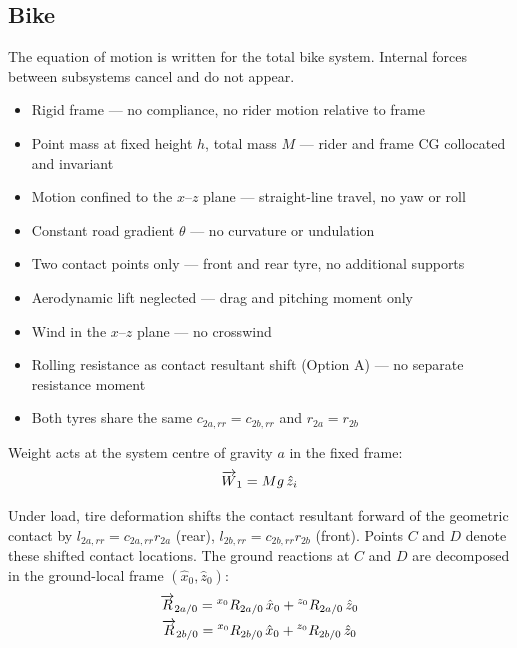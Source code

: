 \begin{aiblock}
\subsection{Bike}
The equation of motion is written for the total bike system. Internal forces between subsystems cancel and do not appear.

\begin{itemize}
    \item Rigid frame --- no compliance, no rider motion relative to frame
    \item Point mass at fixed height $h$, total mass $M$ --- rider and frame CG collocated and invariant
    \item Motion confined to the $x$--$z$ plane --- straight-line travel, no yaw or roll
    \item Constant road gradient $\theta$ --- no curvature or undulation
    \item Two contact points only --- front and rear tyre, no additional supports
    \item Aerodynamic lift neglected --- drag and pitching moment only
    \item Wind in the $x$--$z$ plane --- no crosswind
    \item Rolling resistance as contact resultant shift (Option A) --- no separate resistance moment
    \item Both tyres share the same $c_{2a,rr}=c_{2b,rr}$ and $r_{2a}=r_{2b}$
\end{itemize}

Weight acts at the system centre of gravity $a$ in the fixed frame:
\begin{equation}
    \overrightarrow{W}_1 = Mg\,\hat{z}_i
\end{equation}

Under load, tire deformation shifts the contact resultant forward of the geometric contact by $l_{2a,rr} = c_{2a,rr}r_{2a}$ (rear), $l_{2b,rr} = c_{2b,rr}r_{2b}$ (front). Points $C$ and $D$ denote these shifted contact locations. The ground reactions at $C$ and $D$ are decomposed in the ground-local frame $(\hat{x}_0, \hat{z}_0)$:
\begin{gather}
    \overrightarrow{R}_{2a/0} = {}^{x_0}R_{2a/0}\,\hat{x}_0 + {}^{z_0}R_{2a/0}\,\hat{z}_0 \\
    \overrightarrow{R}_{2b/0} = {}^{x_0}R_{2b/0}\,\hat{x}_0 + {}^{z_0}R_{2b/0}\,\hat{z}_0
\end{gather}


\end{aiblock}
